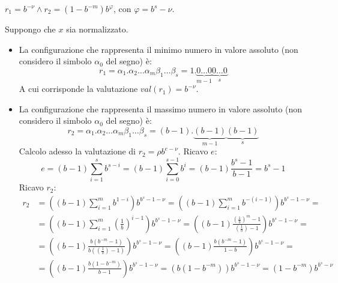 \begin{exercise}[1.6]
$r_{1} = b^{-\nu} \wedge r_{2} = (1 - b^{-m})b^{\varphi}$, con $\varphi = b^{s} - \nu$.
\end{exercise}
Suppongo che $x$ sia normalizzato.
\begin{itemize}
\item La configurazione che rappresenta il minimo
numero in valore assoluto (non considero il simbolo $\alpha_{0}$ del segno) \`e:
\begin{displaymath}
	r_{1} = \alpha_{1}.\alpha_{2} \ldots \alpha_{m} \beta_{1} \ldots \beta_{s} = 
		1.\underbrace{0 \ldots 0}_{m - 1} \underbrace{0 \ldots 0}_{s}
\end{displaymath}
A cui corrisponde la valutazione $val(r_{1}) = b^{-\nu}$.

\item La configurazione che rappresenta il massimo numero in valore assoluto
(non considero il simbolo $\alpha_{0}$ del segno) \`e:
\begin{displaymath}
	r_{2} = \alpha_{1}.\alpha_{2} \ldots \alpha_{m} \beta_{1} \ldots \beta_{s} =
		(b - 1).\underbrace{(b - 1)}_{m - 1}\underbrace{(b - 1)}_{s}
\end{displaymath}
Calcolo adesso la valutazione di $r_{2} = \rho b^{e - \nu}$. Ricavo $e$:
\begin{displaymath}
		e = (b-1)\sum_{i = 1}^{s}{b^{s-i}} = (b-1)\sum_{i = 0}^{s-1}{b^{i}} =
			 (b-1)\frac{b^{s}-1}{b-1} = b^{s}-1
\end{displaymath}
Ricavo $r_{2}$:
\begin{displaymath}
	\begin{split}
		r_{2} 	&= \left ( (b-1)\sum_{i = 1}^{m}{b^{1 - i}} \right)b^{b^{s}-1-\nu} = 
 			\left ( (b-1)\sum_{i = 1}^{m}{b^{-(i - 1)}} \right)b^{b^{s}-1-\nu} = \\
	 			&= \left ( (b-1)\sum_{i = 1}^{m}{\left ( \frac{1}{b} \right ) ^{i - 1}} 
					\right)b^{b^{s}-1-\nu} = 
					\left ( (b-1)\frac{\left ( \frac{1}{b} \right ) ^{m} - 1}{
						\left ( \frac{1}{b} \right ) - 1}
					\right)b^{b^{s}-1-\nu} = \\
				&= \left ( (b-1) \frac{b \left( b^{-m} - 1 \right )}{
						b \left ( \left ( \frac{1}{b} \right ) - 1 \right ) }
					\right)b^{b^{s}-1-\nu} = 
					\left ( (b-1) \frac{b \left( b^{-m} - 1 \right )}{1 - b} 
						\right)b^{b^{s}-1-\nu} = \\
				&= \left ( (b-1) \frac{b \left( 1 - b^{-m} \right )}{b - 1} 
					\right)b^{b^{s}-1-\nu} = 
					\left ( b \left( 1 - b^{-m} \right ) \right)b^{b^{s}-1-\nu} = 
					\left( 1 - b^{-m} \right ) b^{b^{s} - \nu}
	\end{split}
\end{displaymath}
\end{itemize}

